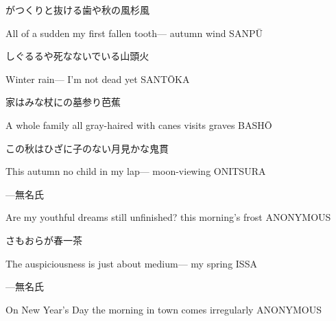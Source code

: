 \begin{haiku}
    {\FH がつくりと抜ける歯や秋の風}\hfill{\FH 杉風}

    \vin{} All of a sudden
    \vin{} \vin{} my first fallen tooth---
    \vin{} \vin{} \vin{} autumn wind \hspace{\fill} SANP\={U}
\end{haiku}

\begin{haiku}
    {\FH しぐるるや死なないでいる}\hfill{\FH 山頭火}

    \vin{} Winter rain---
    \vin{} \vin{} I'm not dead yet \hspace{\fill} SANT\={O}KA
\end{haiku}

\begin{haiku}
    {\FH 家はみな杖にの墓参り}\hfill{\FH 芭蕉}

    \vin{} A whole family
    \vin{} \vin{} all gray-haired with canes
    \vin{} \vin{} \vin{} visits graves \hspace{\fill} BASH\={O}
\end{haiku}

\begin{haiku}
    {\FH この秋はひざに子のない月見かな}\hfill{\FH 鬼貫}

    \vin{} This autumn
    \vin{} \vin{} no child in my lap---
    \vin{} \vin{} \vin{} moon-viewing \hspace{\fill} ONITSURA
\end{haiku}

\begin{haiku}
    {---}\hfill{\FH 無名氏}

    \vin{} Are my youthful dreams
    \vin{} \vin{} still unfinished?
    \vin{} \vin{} \vin{} this morning's frost \hspace{\fill} ANONYMOUS
\end{haiku}

\begin{haiku}
    {\FH {}さもおらが春}\hfill{\FH 一茶}

    \vin{} The auspiciousness
    \vin{} \vin{} is just about medium---
    \vin{} \vin{} \vin{} my spring \hspace{\fill} ISSA
\end{haiku}

\begin{haiku}
    {---}\hfill{\FH 無名氏}

    \vin{} On New Year's Day
    \vin{} \vin{} the morning in town
    \vin{} \vin{} \vin{} comes irregularly \hspace{\fill} ANONYMOUS
\end{haiku}

